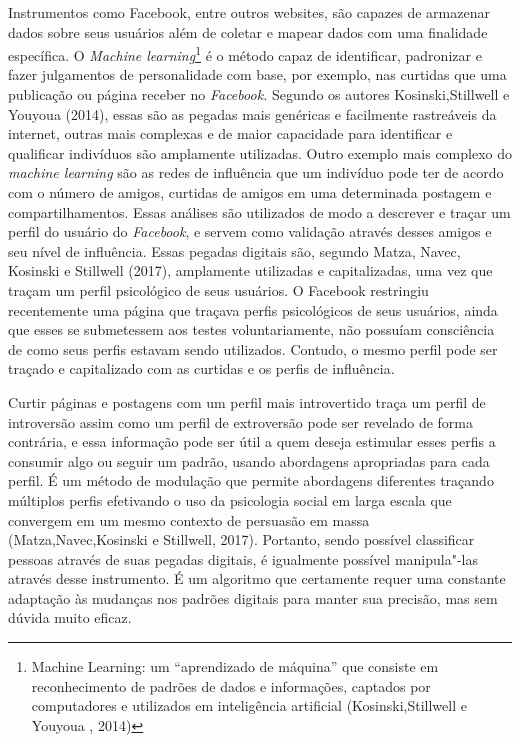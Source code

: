 Instrumentos como Facebook, entre outros websites, são capazes de
armazenar dados sobre seus usuários além de coletar e mapear dados com
uma finalidade específica. O \emph{Machine learning}\footnote{Machine
  Learning: um ``aprendizado de máquina'' que consiste em reconhecimento
  de padrões de dados e informações, captados por computadores e
  utilizados em inteligência artificial (Kosinski,Stillwell e Youyoua ,
  2014)} é o método capaz de identificar, padronizar e fazer julgamentos
de personalidade com base, por exemplo, nas curtidas que uma publicação
ou página receber no \emph{Facebook.} Segundo os autores
Kosinski,Stillwell e Youyoua (2014), essas são as pegadas mais genéricas
e facilmente rastreáveis da internet, outras mais complexas e de maior
capacidade para identificar e qualificar indivíduos são amplamente
utilizadas. Outro exemplo mais complexo do \emph{machine learning} são
as redes de influência que um indivíduo pode ter de acordo com o número
de amigos, curtidas de amigos em uma determinada postagem e
compartilhamentos. Essas análises são utilizados de modo a descrever
e traçar um perfil do usuário do \emph{Facebook}, e servem como
validação através desses amigos e seu nível de influência. Essas pegadas
digitais são, segundo Matza, Navec, Kosinski e Stillwell (2017),
amplamente utilizadas e capitalizadas, uma vez que traçam um perfil
psicológico de seus usuários. O Facebook restringiu recentemente uma
página que traçava perfis psicológicos de seus usuários, ainda que esses
se submetessem aos testes voluntariamente, não possuíam consciência de
como seus perfis estavam sendo utilizados. Contudo, o mesmo perfil pode
ser traçado e capitalizado com as curtidas e os perfis de influência.

Curtir páginas e postagens com um perfil mais introvertido traça um
perfil de introversão assim como um perfil de extroversão pode ser
revelado de forma contrária, e essa informação pode ser útil a quem
deseja estimular esses perfis a consumir algo ou seguir um padrão,
usando abordagens apropriadas para cada perfil. É um método de modulação
que permite abordagens diferentes traçando múltiplos perfis efetivando o
uso da psicologia social em larga escala que convergem em um mesmo
contexto de persuasão em massa (Matza,Navec,Kosinski e Stillwell, 2017).
Portanto, sendo possível classificar pessoas através de suas pegadas
digitais, é igualmente possível manipula"-las através desse instrumento.
É um algoritmo que certamente requer uma constante adaptação às mudanças
nos padrões digitais para manter sua precisão, mas sem dúvida muito
eficaz.

